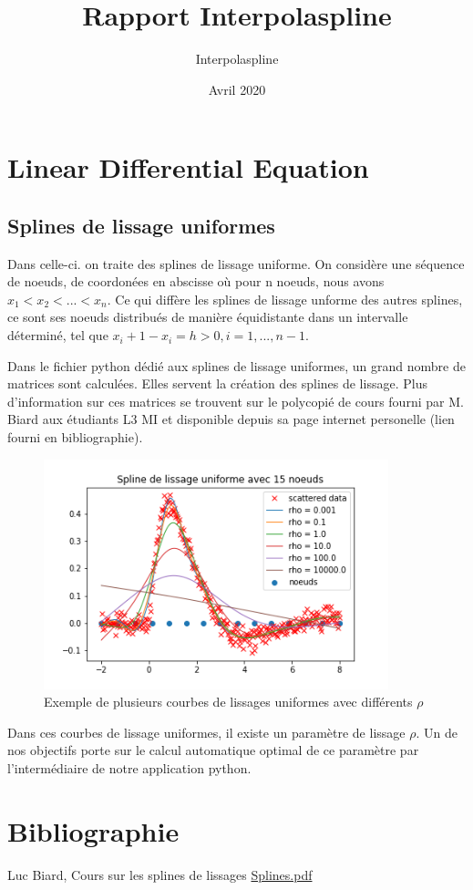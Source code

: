 \documentclass[a4paper,12pt]{article} %
\title{Rapport Interpolaspline}
\author{Interpolaspline}
\date{Avril 2020}
\begin{document}
 \maketitle

\section{Linear Differential Equation}

\subsection{Splines de lissage uniformes}

Dans celle-ci. on traite des splines de lissage uniforme.
On considère une séquence de noeuds,  de coordonées en abscisse où pour n noeuds, nous avons $x_1 < x_2 < ... < x_n$. Ce qui diffère les splines de lissage unforme des autres splines, ce sont ses noeuds distribués de manière équidistante dans un intervalle déterminé, tel que $x_i+1 - x_i = h > 0, i = 1,...,n-1$.

Dans le fichier python dédié aux splines de lissage uniformes, un grand nombre de matrices sont calculées. Elles servent la création des splines de lissage. Plus d'information sur ces matrices se trouvent sur le polycopié de cours fourni par M. Biard aux étudiants L3 MI et disponible depuis sa page internet personelle (lien fourni en bibliographie).

\begin{figure}[htp]
    \centering
    \includegraphics[width=10cm]{IMG_Tache1}
    \caption{Exemple de plusieurs courbes de lissages uniformes avec différents  $\rho$  }
    \label{fig:uniforme}
\end{figure}

Dans ces courbes de lissage uniformes, il existe un paramètre de lissage $\rho$. Un de nos objectifs porte sur le calcul automatique optimal de ce paramètre par l'intermédiaire de notre application python.



\section{Bibliographie}
Luc Biard, Cours sur les splines de lissages
\href{http://www-ljk.imag.fr/membres/Luc.Biard/L3MI_cours/Splines.pdf}{Splines.pdf}
     
\end{document}
